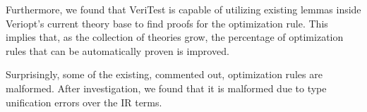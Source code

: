 \documentclass[conference,a4paper,english,10pt]{IEEEtran}[2015/08/26]
\begin{document}
Furthermore, we found that VeriTest is capable of utilizing existing lemmas inside Veriopt's current theory base to find proofs for the 
optimization rule. This implies that, as the collection of theories grow, the percentage of optimization rules that can be 
automatically proven is improved. 

Surprisingly, some of the existing, commented out, optimization rules are malformed. After investigation, we found that it is malformed 
due to type unification errors over the IR terms.







%
\end{document}
